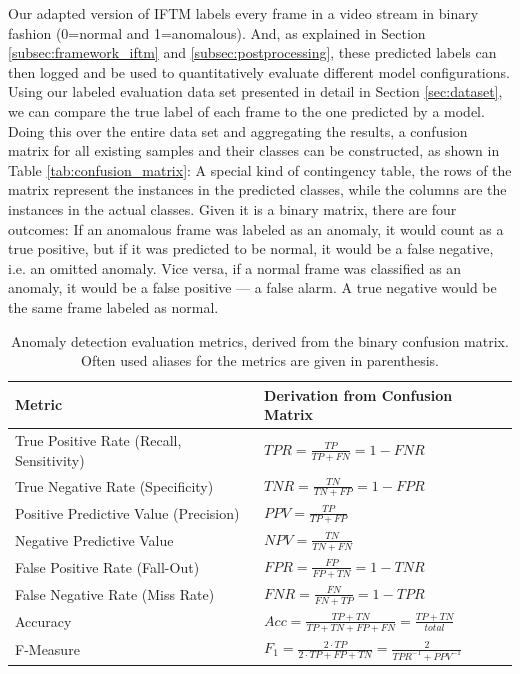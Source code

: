 Our adapted version of IFTM labels every frame in a video stream in binary fashion (0=normal and 1=anomalous). And, as explained in Section \ref{subsec:framework_iftm} and \ref{subsec:postprocessing}, these predicted labels can then logged and be used to quantitatively evaluate different model configurations. Using our labeled evaluation data set presented in detail in Section \ref{sec:dataset}, we can compare the true label of each frame to the one predicted by a model. Doing this over the entire data set and aggregating the results, a confusion matrix for all existing samples and their classes can be constructed, as shown in Table \ref{tab:confusion_matrix}: A special kind of contingency table, the rows of the matrix represent the instances in the predicted classes, while the columns are the instances in the actual classes. Given it is a binary matrix, there are four outcomes: If an anomalous frame was labeled as an anomaly, it would count as a true positive, but if it was predicted to be normal, it would be a false negative, i.e. an omitted anomaly. Vice versa, if a normal frame was classified as an anomaly, it would be a false positive --- a false alarm. A true negative would be the same frame labeled as normal.

\begin{table}
	\centering
	\begin{tabular}{ | L{4.7cm} | l |}
	\toprule
	\textbf{Metric} & \textbf{Derivation from Confusion Matrix} \\
	\midrule
	True Positive Rate \quad \quad 
	(Recall, Sensitivity) & $TPR = \frac{TP}{TP + FN} = 1 - FNR$ \\[1ex]  %
	True Negative Rate 
	(Specificity)  & $TNR = \frac{TN}{TN + FP} = 1 - FPR$ \\[1ex]  %
	Positive Predictive Value 
	(Precision)    & $PPV = \frac{TP}{TP + FP}$ 	        \\[1ex]  %
	Negative Predictive Value
                 & $NPV = \frac{TN}{TN + FN}$ 	        \\[1ex]  %
	False Positive Rate \quad \quad 
	(Fall-Out)     & $FPR = \frac{FP}{FP + TN} = 1 - TNR$ \\[1ex]  %
	False Negative Rate \quad \quad 
	 (Miss Rate)   & $FNR = \frac{FN}{FN + TP} = 1 - TPR$ \\[1ex]  %
	Accuracy       & $Acc = \frac{TP + TN}{TP + TN + FP + FN} = \frac{TP + TN}{total}$ \\[1ex]  %
	F-Measure      & $F_1 = \frac{2 \cdot TP}{2 \cdot TP + FP + TN} = \frac{2}{TPR^{-1}+PPV^{-1}}$ 	\\[1ex]  %
	\bottomrule
	\end{tabular}
	\caption[Anomaly detection evaluation metrics.]{Anomaly detection evaluation metrics, derived from the binary confusion matrix. Often used aliases for the metrics are given in parenthesis.}
	\label{tab:eval_metrics}
\end{table}

